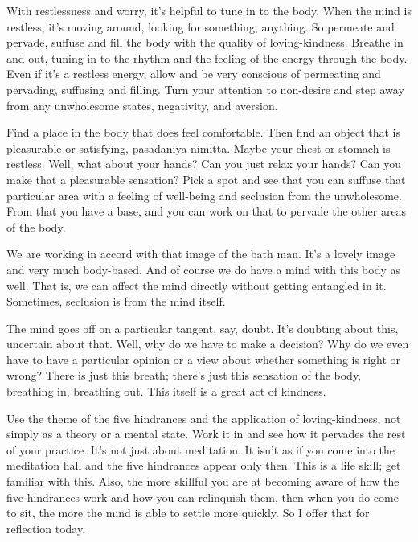 With restlessness and worry, it’s helpful to tune in to the body. When
the mind is restless, it’s moving around, looking for something,
anything. So permeate and pervade, suffuse and fill the body with the
quality of loving-kindness. Breathe in and out, tuning in to the rhythm
and the feeling of the energy through the body. Even if it’s a restless
energy, allow and be very conscious of permeating and pervading,
suffusing and filling. Turn your attention to non-desire and step away
from any unwholesome states, negativity, and aversion.

Find a place in the body that does feel comfortable. Then find an object
that is pleasurable or satisfying, pasādaniya nimitta. Maybe your chest
or stomach is restless. Well, what about your hands? Can you just relax
your hands? Can you make that a pleasurable sensation? Pick a spot and
see that you can suffuse that particular area with a feeling of
well-being and seclusion from the unwholesome. From that you have a
base, and you can work on that to pervade the other areas of the body.

We are working in accord with that image of the bath man. It’s a lovely
image and very much body-based. And of course we do have a mind with
this body as well. That is, we can affect the mind directly without
getting entangled in it. Sometimes, seclusion is from the mind itself.

The mind goes off on a particular tangent, say, doubt. It’s doubting
about this, uncertain about that. Well, why do we have to make a
decision? Why do we even have to have a particular opinion or a view
about whether something is right or wrong? There is just this breath;
there’s just this sensation of the body, breathing in, breathing out.
This itself is a great act of kindness.

Use the theme of the five hindrances and the application of
loving-kindness, not simply as a theory or a mental state. Work it in
and see how it pervades the rest of your practice. It’s not just about
meditation. It isn’t as if you come into the meditation hall and the
five hindrances appear only then. This is a life skill; get familiar
with this. Also, the more skillful you are at becoming aware of how the
five hindrances work and how you can relinquish them, then when you do
come to sit, the more the mind is able to settle more quickly. So I
offer that for reflection today.
